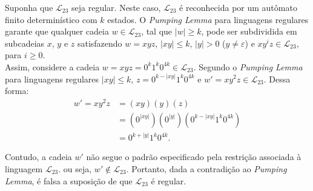 \documentclass[12pt]{article}
\def\myling{{23}} %
\begin{document}
%
\begin{tcolorbox}[rounded corners, colback=yellow!5, colframe=red!40!black]
Suponha que $\mathcal{L}_{\myling}$ seja regular. Neste caso, $\mathcal{L}_{\myling}$ é reconhecida por um autômato finito determinístico com $k$ estados. O \emph{Pumping Lemma} para linguagens regulares garante que qualquer cadeia $w\in \mathcal{L}_{\myling}$, tal que $|w|\geqslant k$, pode ser subdividida em subcadeias $x$, $y$ e $z$ satisfazendo $w=xyz$, $|xy|\leqslant k$, $|y|>0$ ($y\neq\varepsilon$) e $xy^iz\in \mathcal{L}_{\myling}$, para $i\geqslant 0$.\\

Assim, considere a cadeia $w=xyz=0^k1^k0^{4k}\in \mathcal{L}_{\myling}$. Segundo o \emph{Pumping Lemma} para linguagens regulares $|xy|\leqslant k$, $z=0^{k-|xy|}1^k0^{4k}$ e $w'= xy^2z\in \mathcal{L}_{\myling}$. Dessa forma:
\begin{align*}
 w' = xy^2z &= (xy)(y)(z)\\
            &= (0^{|xy|})(0^{|y|})(0^{k-|xy|}1^k0^{4k})\\
            &= 0^{k+|y|}1^k0^{4k}.
\end{align*}

Contudo, a cadeia $w'$ não segue o padrão especificado pela restrição associada à linguagem $\mathcal{L}_{\myling}$. ou seja, $w'\notin\mathcal{L}_{\myling}$. Portanto, dada a contradição ao \emph{Pumping Lemma}, é falsa a suposição de que $\mathcal{L}_{\myling}$ é regular.
\end{tcolorbox}
%
\end{document}
